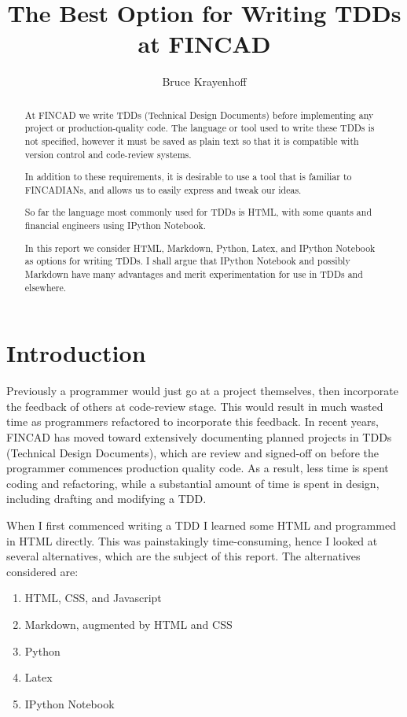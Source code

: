 \documentclass[]{article}
\title{The Best Option for Writing TDDs at FINCAD}
\author{Bruce Krayenhoff}
\begin{document}
\maketitle

\begin{abstract}
At FINCAD we write TDDs (Technical Design Documents) before implementing any project or production-quality code.  
The language or tool used to write these TDDs is not specified, however it must be saved as plain text so that it is 
compatible with version control and code-review systems.

In addition to these requirements, it is desirable to use a tool that is familiar to FINCADIANs, and allows us to easily express and tweak our ideas.

So far the language most commonly used for TDDs is HTML, with some quants and financial engineers using IPython Notebook.

In this report we consider HTML, Markdown, Python, Latex, and IPython Notebook as options for writing TDDs.  
I shall argue that IPython Notebook and possibly Markdown have many advantages and merit experimentation for use in TDDs and elsewhere.
\end{abstract}

\section{Introduction}
Previously a programmer would just go at a project themselves, then incorporate the feedback of others at code-review stage.  
This would result in much wasted time as programmers refactored to incorporate this feedback. 
In recent years, FINCAD has moved toward extensively documenting planned projects in TDDs (Technical Design Documents), 
which are review and signed-off on before the programmer commences production quality code.  
As a result, less time is spent coding and refactoring, while a substantial amount of time is spent in design, including drafting and modifying a TDD.

When I first commenced writing a TDD I learned some HTML and programmed in HTML directly. 
This was painstakingly time-consuming, hence I looked at several alternatives, which are the subject of this report.  
The alternatives considered are:

\begin{enumerate}
	\item HTML, CSS, and Javascript
	\item Markdown, augmented by HTML and CSS
	\item Python
	\item Latex
	\item IPython Notebook
\end{enumerate}
\end{document}
